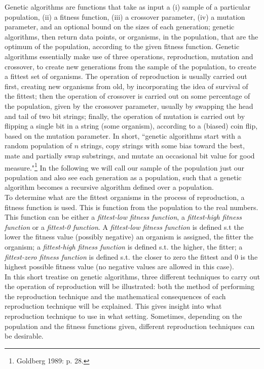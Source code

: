 \documentclass[a4paper]{article}
\theoremstyle{dotless}
\begin{document}
Genetic algorithms are functions that take as input a (i) sample of a particular population, (ii) a fitness function, (iii) a crossover parameter, (iv) a mutation parameter, and an optional bound on the sizes of each generation; genetic algorithms, then return data points, or organisms, in the population, that are the optimum of the population, according to the given fitness function. Genetic algorithms essentially make use of three operations, reproduction, mutation and crossover, to create new generations from the sample of the population, to create a fittest set of organisms. The operation of reproduction is usually carried out first, creating new organisms from old, by incorporating the idea of survival of the fittest; then the operation of crossover is carried out on some percentage of the population, given by the crossover parameter, usually by swapping the head and tail of two bit strings; finally, the operation of mutation is carried out by flipping a single bit in a string (some organism), according to a (biased) coin flip, based on the mutation parameter. In short, ``genetic algorithms start with a random population of $n$ strings, copy strings with some bias toward the best, mate and partially swap substrings, and mutate an occasional bit value for good measure."\footnote{Goldberg 1989: p. 28.} In the following we will call our sample of the population just our population and also see each generation as a population, such that a genetic algorithm becomes a recursive algorithm defined over a population.\\

To determine what are the fittest organisms in the process of reproduction, a fitness function is used. This is function from the population to the real numbers. This function can be either a \emph{fittest-low fitness function}, a \emph{fittest-high fitness function} or a \emph{fittest-0 function}. A \emph{fittest-low fitness function} is defined s.t the lower the fitness value (possibly negative) an organism is assigned, the fitter the organism; a \emph{fittest-high fitness function} is defined s.t. the higher, the fitter; a \emph{fittest-zero fitness function} is defined s.t. the closer to zero the fittest and 0 is the highest possible fitness value (no negative values are allowed in this case).\\

In this short treatise on genetic algorithms, three different techniques to carry out the operation of reproduction will be illustrated: both the method of performing the reproduction technique and the mathematical consequences of each reproduction technique will be explained. This gives insight into what reproduction technique to use in what setting. Sometimes, depending on the population and the fitness functions given, different reproduction techniques can be desirable. 
\end{document}
